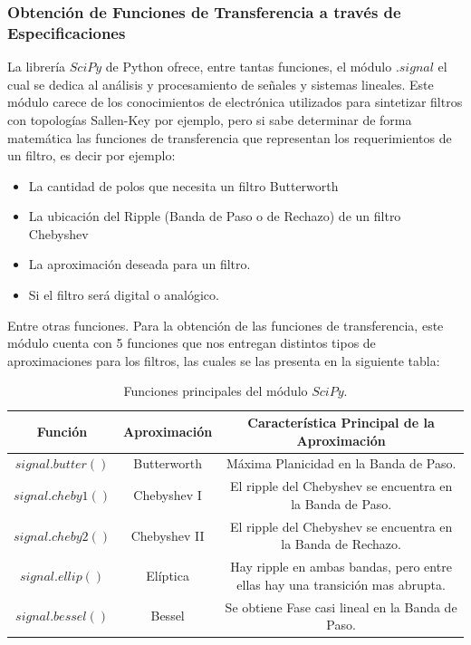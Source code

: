 \documentclass[12pt,a4paper]{article}
\begin{document}
\subsubsection{Obtención de Funciones de Transferencia a través de Especificaciones}
La librería $SciPy$ de Python ofrece, entre tantas funciones, el módulo $.signal$ el cual se dedica al análisis y procesamiento de señales y sistemas lineales. Este módulo carece de los conocimientos de electrónica utilizados para sintetizar filtros con topologías Sallen-Key por ejemplo, pero si sabe determinar de forma matemática las funciones de transferencia que representan los requerimientos de un filtro, es decir por ejemplo:

\begin{itemize}
    \item La cantidad de polos que necesita un filtro Butterworth
    \item La ubicación del Ripple (Banda de Paso o de Rechazo) de un filtro Chebyshev
    \item La aproximación deseada para un filtro.
    \item Si el filtro será digital o analógico.
\end{itemize}

Entre otras funciones. Para la obtención de las funciones de transferencia, este módulo cuenta con 5 funciones que nos entregan distintos tipos de aproximaciones para los filtros, las cuales se las presenta en la siguiente tabla:

\begin{table}[H]
    \centering
    \begin{tabular}{| c | c | c |} \hline
        \textbf{Función} & \textbf{Aproximación} & \textbf{Característica Principal de la Aproximación} \\ \hline
        \multirow{2}{*}{$signal.butter()$} & \multirow{2}{*}{Butterworth} & \multirow{2}{9,5cm}{Máxima Planicidad en la Banda de Paso.} \\ & & \\ \hline
        \multirow{2}{*}{$signal.cheby1()$} & \multirow{2}{*}{Chebyshev I} & \multirow{2}{9,5cm}{El ripple del Chebyshev se encuentra en la Banda de Paso.} \\ & &\\ \hline
        \multirow{2}{*}{$signal.cheby2()$} & \multirow{2}{*}{Chebyshev II} & \multirow{2}{9,5cm}{El ripple del Chebyshev se encuentra en la Banda de Rechazo.}\\ & &\\ \hline
        \multirow{2}{*}{$signal.ellip()$} & \multirow{2}{*}{Elíptica} & \multirow{2}{9,5cm}{Hay ripple en ambas bandas, pero entre ellas hay una transición mas abrupta.}\\ & & \\ \hline
        \multirow{2}{*}{$signal.bessel()$} & \multirow{2}{*}{Bessel} & \multirow{2}{9,5cm}{Se obtiene Fase casi lineal en la Banda de Paso.}\\ & & \\ \hline
    \end{tabular}
    \caption{Funciones principales del módulo $SciPy$.}
    \label{tab:tb_1}
\end{table}
\end{document}
